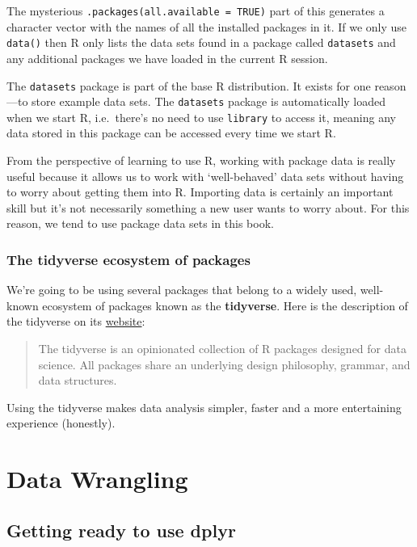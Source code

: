 \documentclass[
]{book}
\begin{document}
The mysterious \texttt{.packages(all.available\ =\ TRUE)} part of this generates a character vector with the names of all the installed packages in it. If we only use \texttt{data()} then R only lists the data sets found in a package called \texttt{datasets} and any additional packages we have loaded in the current R session.

The \texttt{datasets} package is part of the base R distribution. It exists for one reason---to store example data sets. The \texttt{datasets} package is automatically loaded when we start R, i.e.~there's no need to use \texttt{library} to access it, meaning any data stored in this package can be accessed every time we start R.

From the perspective of learning to use R, working with package data is really useful because it allows us to work with `well-behaved' data sets without having to worry about getting them into R. Importing data is certainly an important skill but it's not necessarily something a new user wants to worry about. For this reason, we tend to use package data sets in this book.

\hypertarget{the-tidyverse-ecosystem-of-packages}{%
\section{The tidyverse ecosystem of packages}\label{the-tidyverse-ecosystem-of-packages}}

We're going to be using several packages that belong to a widely used, well-known ecosystem of packages known as the \textbf{tidyverse}. Here is the description of the tidyverse on its \href{https://www.tidyverse.org/}{website}:

\begin{quote}
The tidyverse is an opinionated collection of R packages designed for data science. All packages share an underlying design philosophy, grammar, and data structures.
\end{quote}

Using the tidyverse makes data analysis simpler, faster and a more entertaining experience (honestly).

\hypertarget{part-data-wrangling}{%
\part{Data Wrangling}\label{part-data-wrangling}}

\hypertarget{getting-ready-to-use-dplyr}{%
\chapter{\texorpdfstring{\textbf{Getting ready to use dplyr}}{Getting ready to use dplyr}}\label{getting-ready-to-use-dplyr}}
\end{document}
